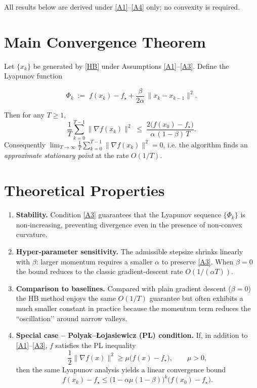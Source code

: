 \documentclass{article}
\begin{document}
All results below are derived under \ref{A1}–\ref{A4} only; no convexity is required.

\section*{Main Convergence Theorem}

\begin{theorem}\label{thm:main}
Let $\{x_{k}\}$ be generated by \eqref{HB} under Assumptions \ref{A1}–\ref{A3}.  
Define the Lyapunov function  

\[
\Phi_{k}\;:=\; f(x_{k})-\!f_{\star}+\frac{\beta}{2\alpha}\,\|x_{k}-x_{k-1}\|^{2}.
\tag{T1}
\]

Then for any $T\ge 1$,
\[
\frac{1}{T}\sum_{k=0}^{T-1}\|\nabla f(x_{k})\|^{2}
\;\le\;
\frac{2\bigl(f(x_{0})-f_{\star}\bigr)}{\alpha\,(1-\beta)\,T}.
\tag{T2}
\]
Consequently $\displaystyle\lim_{T\to\infty}\frac{1}{T}\sum_{k=0}^{T-1}\|\nabla f(x_{k})\|^{2}=0$,
i.e. the algorithm finds an \emph{approximate stationary point} at the rate $O(1/T)$.
\end{theorem}

\section*{Theoretical Properties}

\begin{enumerate}[label={\bf P\arabic*}.]
\item \textbf{Stability.} Condition \eqref{A3} guarantees that the Lyapunov sequence $\{\Phi_{k}\}$ is non‑increasing, preventing divergence even in the presence of non‑convex curvature.

\item \textbf{Hyper‑parameter sensitivity.} The admissible stepsize shrinks linearly with $\beta$: larger momentum requires a smaller $\alpha$ to preserve \eqref{A3}.  When $\beta=0$ the bound reduces to the classic gradient‑descent rate $O(1/(\alpha T))$.

\item \textbf{Comparison to baselines.} Compared with plain gradient descent ($\beta=0$) the HB method enjoys the same $O(1/T)$ guarantee but often exhibits a much smaller constant in practice because the momentum term reduces the “oscillation’’ around narrow valleys.

\item \textbf{Special case – Polyak–Łojasiewicz (PL) condition.} If, in addition to \ref{A1}–\ref{A3}, $f$ satisfies the PL inequality
\[
\frac{1}{2}\|\nabla f(x)\|^{2}\ge\mu\bigl(f(x)-f_{\star}\bigr),\qquad \mu>0,
\]
then the same Lyapunov analysis yields a linear convergence bound
\[
f(x_{k})-f_{\star}\le\bigl(1-\alpha\mu(1-\beta)\bigr)^{k}\bigl(f(x_{0})-f_{\star}\bigr).
\]
\end{enumerate}
\end{document}
